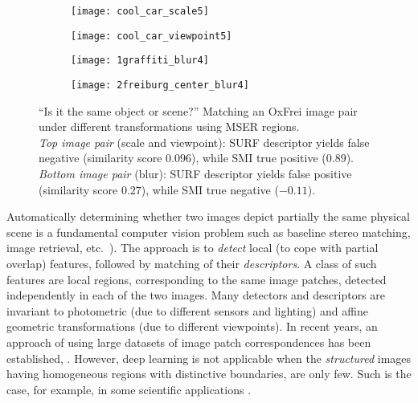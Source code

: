 \documentclass[a4paper,11pt]{article}
\begin{document}
\begin{wrapfigure}{r}{0.5\textwidth}
 \vspace{-22pt} 
\begin{center}
\begin{subfigure}[b]{0.22\textwidth}
  \texttt{[image: cool\_car\_scale5]}
\end{subfigure}
\begin{subfigure}[b]{0.22\textwidth}
\texttt{[image: cool\_car\_viewpoint5]}
\end{subfigure}
\end{center}
\vspace{-22pt}
\begin{center}
\begin{subfigure}[b]{0.22\textwidth}
  \texttt{[image: 1graffiti\_blur4]}
\end{subfigure}
\begin{subfigure}[b]{0.22\textwidth}
\texttt{[image: 2freiburg\_center\_blur4]}
\end{subfigure}
\end{center}
\vspace{-20pt}
\caption{\footnotesize ``Is it the same object or scene?'' Matching an OxFrei image pair under different transformations using MSER regions.\\ {\em Top image pair} (scale and viewpoint): SURF descriptor yields false negative (similarity score $0.096$), while SMI true positive ($0.89$).
{\em Bottom image pair} (blur): SURF descriptor yields false positive (similarity score $0.27$), while SMI  true negative ($-0.11$).}
\label{fig:intro1}
  \vspace{-16pt}
\end{wrapfigure}

Automatically determining whether two images depict partially the same physical scene is a fundamental computer vision problem such as baseline stereo matching, image retrieval, etc.~\cite{EscaleraCVPR07,Matas2002BMVC}). The approach is to {\em detect} local (to cope with partial overlap) features, followed by matching of their {\em descriptors}.
 A class of such features are local regions, corresponding to the same image patches, detected independently in each of the two images. Many detectors and descriptors are invariant to photometric (due to different sensors and lighting) and affine geometric transformations (due to different viewpoints). In recent years, an approach of using large datasets of image patch correspondences has been established, \cite{Snavely2008, ZagoruykoK15}. However,  deep learning is not applicable when the {\em structured} images having homogeneous regions with distinctive boundaries, are only few. Such is the case, for example, in some scientific applications \cite{Ranguelova2016AICCSA}.
\end{document}
